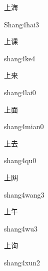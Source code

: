 \begin{multicols*}{2}
\begin{verbete}{上海}
\begin{pronuncia}{Shang4hai3}
\end{pronuncia}
\end{verbete}

\begin{verbete}[shang4ke4]{上课}
\begin{pronuncia}{shang4ke4}
\end{pronuncia}
\end{verbete}

\begin{verbete}{上来}
\begin{pronuncia}{shang4lai0}
\end{pronuncia}
\end{verbete}

\begin{verbete}{上面}
\begin{pronuncia}{shang4mian0}
\end{pronuncia}
\end{verbete}

\begin{verbete}[shang4qu0]{上去}
\begin{pronuncia}{shang4qu0}
\end{pronuncia}
\end{verbete}

\begin{verbete}{上网}
\begin{pronuncia}{shang4wang3}
\end{pronuncia}
\end{verbete}

\begin{verbete}[shang4wu3]{上午}
\begin{pronuncia}{shang4wu3}
\end{pronuncia}
\end{verbete}

\begin{verbete}{上询}
\begin{pronuncia}{shang4xun2}
\end{pronuncia}
\end{verbete}


\end{multicols*}
